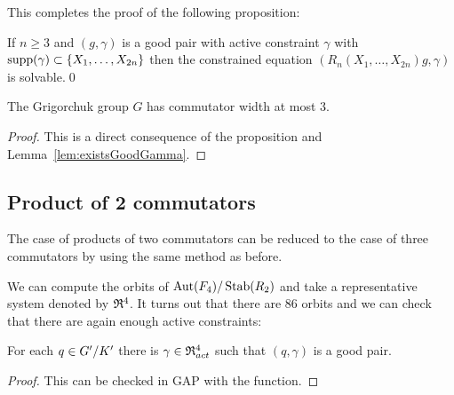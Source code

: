 \documentclass[a4paper,11pt]{amsart}
\begin{document}
This completes the proof of the following proposition:
\begin{pro}\label{pro:solvableConstraintedEquations}
 If $n\geq3$ and $(g,\gamma)$ is a good pair with active constraint $\gamma$ with $\operatorname{{supp}}(\gamma)\subset\{X_1,\dotsc,X_{2n}\}$
 then the constrained equation $(R_n(X_1,\dotsc,X_{2n})g,\gamma)$ is solvable.\qed
\end{pro}
\begin{cor}
 The Grigorchuk group $G$ has commutator width at most $3$.
\end{cor}
\begin{proof}
 This is a direct consequence of the proposition and Lemma~\ref{lem:existsGoodGamma}.
\end{proof}

\subsection{Product of 2 commutators}
The case of products of two commutators can be reduced to the case of three commutators by using the same method as before.

We can compute the orbits of ${\operatorname{{Aut}}(F_4)/\operatorname{Stab}(R_2)}$ and take a representative system denoted by $\mathfrak{R}^4$.
It turns out that there are $86$ orbits and we can check that there are again enough active constraints:
\begin{lem} \label{lem:existsGoodGammaForRed4}
 For each $q\in{G'/K'}$ there is $\gamma\in \mathfrak{R}^4_{act}$ such that $(q,\gamma)$ is a 
 good pair.
\end{lem}
\begin{proof}
 This can be checked in GAP with the function\newline {}.
\end{proof}
\end{document}
